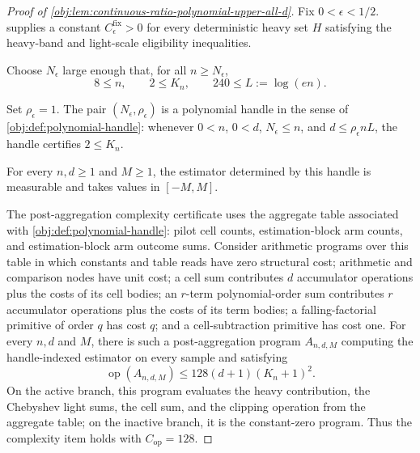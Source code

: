 \begin{proof}[Proof of \cref{obj:lem:continuous-ratio-polynomial-upper-all-d}]
Fix \(0<\epsilon<1/2\).   supplies a constant \(C_{\epsilon}^{\mathrm{fix}}>0\) for every deterministic heavy set \(H\) satisfying the heavy-band and light-scale eligibility inequalities. %

Choose \(N_\epsilon\) large enough that, for all \(n\ge N_\epsilon\),
\[
8\le n,
\qquad
2\le K_n,
\qquad
240\le L:=\log(en).
\]

Set \(\rho_\epsilon=1\).  The pair \((N_\epsilon,\rho_\epsilon)\) is a polynomial handle in the sense of \cref{obj:def:polynomial-handle}: whenever \(0<n\), \(0<d\), \(N_\epsilon\le n\), and \(d\le \rho_\epsilon nL\), the handle certifies \(2\le K_n\). %

For every \(n,d\ge1\) and \(M\ge1\), the estimator determined by this handle is measurable and takes values in \([-M,M]\). %

The post-aggregation complexity certificate uses the aggregate table associated with \cref{obj:def:polynomial-handle}: pilot cell counts, estimation-block arm counts, and estimation-block arm outcome sums.  Consider arithmetic programs over this table in which constants and table reads have zero structural cost; arithmetic and comparison nodes have unit cost; a cell sum contributes \(d\) accumulator operations plus the costs of its cell bodies; an \(r\)-term polynomial-order sum contributes \(r\) accumulator operations plus the costs of its term bodies; a falling-factorial primitive of order \(q\) has cost \(q\); and a cell-subtraction primitive has cost one.  For every \(n,d\) and \(M\), there is such a post-aggregation program \(A_{n,d,M}\) computing the handle-indexed estimator on every sample and satisfying
\[
\operatorname{op}(A_{n,d,M})
\le
128(d+1)(K_n+1)^2.
\]
On the active branch, this program evaluates the heavy contribution, the Chebyshev light sums, the cell sum, and the clipping operation from the aggregate table; on the inactive branch, it is the constant-zero program.  Thus the complexity item holds with \(C_{\mathrm{op}}=128\). %


\end{proof}
